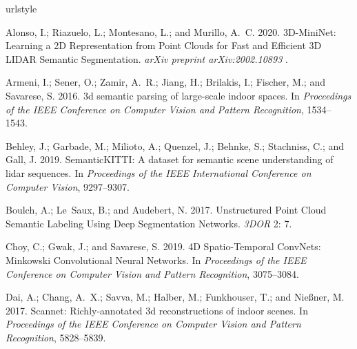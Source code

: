 \documentclass[letterpaper]{article} \usepackage{aaai21}  \usepackage{times}  \usepackage{helvet} \usepackage{courier}  \usepackage[hyphens]{url}  \usepackage{graphicx} \urlstyle{rm} \def\UrlFont{\rm}  \usepackage{natbib}  \usepackage{booktabs}
\begin{document}
   

	\begin{thebibliography}{48}
\providecommand{\natexlab}[1]{#1}
\providecommand{\url}[1]{\texttt{#1}}
\providecommand{\urlprefix}{URL }
\expandafter\ifx\csname urlstyle\endcsname\relax
  \providecommand{\doi}[1]{doi:\discretionary{}{}{}#1}\else
  \providecommand{\doi}{doi:\discretionary{}{}{}\begingroup
  \urlstyle{rm}\Url}\fi

Alonso, I.; Riazuelo, L.; Montesano, L.; and Murillo, A.~C. 2020.
\newblock 3D-MiniNet: Learning a 2D Representation from Point Clouds for Fast
  and Efficient 3D LIDAR Semantic Segmentation.
\newblock \emph{arXiv preprint arXiv:2002.10893} .

Armeni, I.; Sener, O.; Zamir, A.~R.; Jiang, H.; Brilakis, I.; Fischer, M.; and
  Savarese, S. 2016.
\newblock 3d semantic parsing of large-scale indoor spaces.
\newblock In \emph{Proceedings of the IEEE Conference on Computer Vision and
  Pattern Recognition}, 1534--1543.

Behley, J.; Garbade, M.; Milioto, A.; Quenzel, J.; Behnke, S.; Stachniss, C.;
  and Gall, J. 2019.
\newblock SemanticKITTI: A dataset for semantic scene understanding of lidar
  sequences.
\newblock In \emph{Proceedings of the IEEE International Conference on Computer
  Vision}, 9297--9307.

Boulch, A.; Le~Saux, B.; and Audebert, N. 2017.
\newblock Unstructured Point Cloud Semantic Labeling Using Deep Segmentation
  Networks.
\newblock \emph{3DOR} 2: 7.

Choy, C.; Gwak, J.; and Savarese, S. 2019.
\newblock 4D Spatio-Temporal ConvNets: Minkowski Convolutional Neural Networks.
\newblock In \emph{Proceedings of the IEEE Conference on Computer Vision and
  Pattern Recognition}, 3075--3084.

Dai, A.; Chang, A.~X.; Savva, M.; Halber, M.; Funkhouser, T.; and Nie{\ss}ner,
  M. 2017.
\newblock Scannet: Richly-annotated 3d reconstructions of indoor scenes.
\newblock In \emph{Proceedings of the IEEE Conference on Computer Vision and
  Pattern Recognition}, 5828--5839.


\end{thebibliography}
\end{document}
